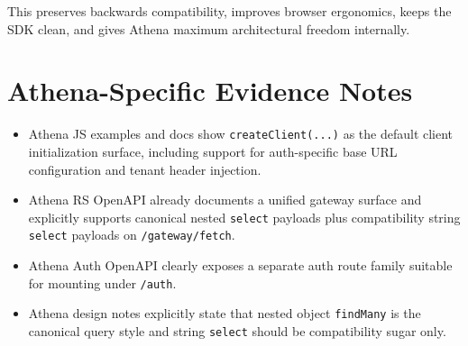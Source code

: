 \documentclass[11pt]{article}
\begin{document}
This preserves backwards compatibility, improves browser ergonomics, keeps the SDK clean, and gives Athena maximum architectural freedom internally.

\section*{Athena-Specific Evidence Notes}

\begin{itemize}[leftmargin=1.5em]
  \item Athena JS examples and docs show \texttt{createClient(...)} as the default client initialization surface, including support for auth-specific base URL configuration and tenant header injection.
  \item Athena RS OpenAPI already documents a unified gateway surface and explicitly supports canonical nested \texttt{select} payloads plus compatibility string \texttt{select} payloads on \texttt{/gateway/fetch}.
  \item Athena Auth OpenAPI clearly exposes a separate auth route family suitable for mounting under \texttt{/auth}.
  \item Athena design notes explicitly state that nested object \texttt{findMany} is the canonical query style and string \texttt{select} should be compatibility sugar only.
\end{itemize}
\end{document}
